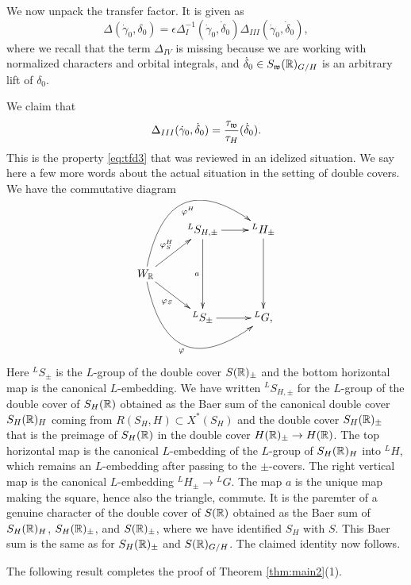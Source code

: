 \documentclass{article}
\theoremstyle{definition}
\numberwithin{equation}{section}
\renewcommand{\-}{\hyp{}}
\begin{document}
We now unpack the transfer factor. It is given as
\[ \Delta(\dot\gamma_0,\delta_0) = \epsilon\Delta_I^{-1}(\dot\gamma_0,\dot\delta_0)\Delta_{III}(\dot\gamma_0,\dot\delta_0), \]
where we recall that the term $\Delta_{IV}$ is missing because we are working with normalized characters and orbital integrals, and $\dot\delta_0 \in S_{\mathfrak{w}}(\mathbb{R})_{G/H}$ is an arbitrary lift of $\delta_0$.

We claim that
\[ \Delta_{III}(\dot\gamma_0,\dot\delta_0) = \frac{\tau_{\mathfrak{w}}}{\tau_H}(\dot\delta_0). \]
This is the property \eqref{eq:tfd3} that was reviewed in an idelized situation. We say here a few more words about the actual situation in the setting of double covers. We have the commutative diagram
\[ \xymatrix{
	&^LS_{H,\pm}\ar[dd]_a\ar[r]&^LH_\pm\ar[dd]\\
	W_\R\ar[ru]^{\varphi^H_S}\ar@/^4pc/[rru]_-{\varphi^H}\ar[rd]_{\varphi_S}\ar@/_4pc/[rrd]_-{\varphi}\\
	&^LS_\pm\ar[r]&^LG,
}
\]
Here $^LS_\pm$ is the $L$\-group of the double cover $S(\mathbb{R})_\pm$ and the bottom horizontal map is the canonical $L$\-embedding. We have written $^LS_{H,\pm}$ for the $L$\-group of the double cover of $S_H(\mathbb{R})$ obtained as the Baer sum of the canonical double cover $S_H(\mathbb{R})_H$ coming from $R(S_H,H) \subset X^*(S_H)$ and the double cover $S_H(\mathbb{R})_\pm$ that is the preimage of $S_H(\mathbb{R})$ in the double cover $H(\mathbb{R})_\pm \to H(\mathbb{R})$. The top horizontal map is the canonical $L$\-embedding of the $L$\-group of $S_H(\mathbb{R})_H$ into $^LH$, which remains an $L$\-embedding after passing to the $\pm$-covers. The right vertical map is the canonical $L$\-embedding $^LH_\pm \to {^LG}$. The map $a$ is the unique map making the square, hence also the triangle, commute. It is the paremter of a genuine character of the double cover of $S(\mathbb{R})$ obtained as the Baer sum of $S_H(\mathbb{R})_H$, $S_H(\mathbb{R})_\pm$, and $S(\mathbb{R})_\pm$, where we have identified $S_H$ with $S$. This Baer sum is the same as for $S_H(\mathbb{R})_\pm$ and $S(\mathbb{R})_{G/H}$. The claimed identity now follows.

The following result completes the proof of Theorem \ref{thm:main2}(1).
\end{document}
